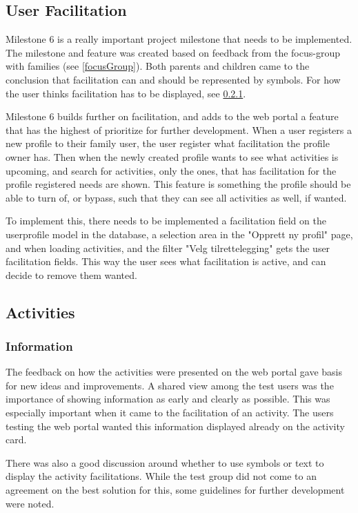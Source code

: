 \subsection{User Facilitation}
Milestone 6 is a really important project milestone that needs to be implemented. The milestone and feature was created based on feedback from the focus-group with families (see \ref{focusGroup}). Both parents and children came to the conclusion that facilitation can and should be represented by symbols. For how the user thinks facilitation has to be displayed, see \ref{UserFeedbackAboutActivities}. 

Milestone 6 builds further on facilitation, and adds to the web portal a feature that has the highest of prioritize for further development. When a user registers a new profile to their family user, the user register what facilitation the profile owner has. Then when the newly created profile wants to see what activities is upcoming, and search for activities, only the ones, that has facilitation for the profile registered needs are shown. This feature is something the profile should be able to turn of, or bypass, such that they can see all activities as well, if wanted.

To implement this, there needs to be implemented a facilitation field on the userprofile model in the database, a selection area in the "Opprett ny profil" page, and when loading activities, and the filter "Velg tilrettelegging" gets the user facilitation fields. This way the user sees what facilitation is active, and can decide to remove them wanted. 

\subsection{Activities}
\subsubsection{Information}
\label{UserFeedbackAboutActivities}
The feedback on how the activities were presented on the web portal gave basis for new ideas and improvements. A shared view among the test users was the importance of showing information as early and clearly as possible. This was especially important when it came to the facilitation of an activity. The users testing the web portal wanted this information displayed already on the activity card.

There was also a good discussion around whether to use symbols or text to display the activity facilitations. While the test group did not come to an agreement on the best solution for this, some guidelines for further development were noted. 

